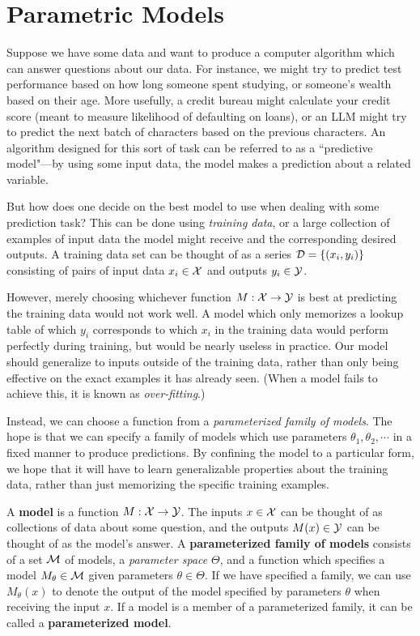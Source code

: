 \documentclass[12pt,twoside]{reedthesis}
\begin{document}
\section{Parametric Models}
Suppose we have some data and want to produce a computer algorithm which can answer questions about our data. For instance, we might try to predict test performance based on how long someone spent studying, or someone's wealth based on their age. More usefully, a credit bureau might calculate your credit score (meant to measure likelihood of defaulting on loans), or an LLM might try to predict the next batch of characters based on the previous characters. An algorithm designed for this sort of task can be referred to as a ``predictive model"—by using some input data, the model makes a prediction about a related variable.

But how does one decide on the best model to use when dealing with some prediction task? This can be done using \textit{training data}, or a large collection of examples of input data the model might receive and the corresponding desired outputs. A training data set can be thought of as a series $\mathcal{D} = \left\{ (x_i, y_i) \right\}$ consisting of pairs of input data $x_i \in \mathcal{X}$ and outputs $y_i \in \mathcal{Y}$.

However, merely choosing whichever function $M: \mathcal{X} \to \mathcal{Y}$ is best at predicting the training data would not work well. A model which only memorizes a lookup table of which $y_i$ corresponds to which $x_i$ in the training data would perform perfectly during training, but would be nearly useless in practice. Our model should generalize to inputs outside of the training data, rather than only being effective on the exact examples it has already seen. (When a model fails to achieve this, it is known as \textit{over-fitting}.)

Instead, we can choose a function from a \textit{parameterized family of models}. The hope is that we can specify a family of models which use parameters $\theta_1, \theta_2, \cdots$ in a fixed manner to produce predictions. By confining the model to a particular form, we hope that it will have to learn generalizable properties about the training data, rather than just memorizing the specific training examples.

\begin{definition}
A \textbf{model} is a function $M: \mathcal{X} \to \mathcal{Y}$. The inputs $x \in \mathcal{X}$ can be thought of as collections of data about some question, and the outputs $M(x) \in \mathcal{Y}$ can be thought of as the model's answer. A \textbf{parameterized family of models} consists of a set $\mathcal{M}$ of models, a \textit{parameter space} $\Theta$, and a function which specifies a model $M_\theta \in \mathcal{M}$ given parameters $\theta \in \Theta$. If we have specified a family, we can use $M_\theta(x)$ to denote the output of the model specified by parameters $\theta$ when receiving the input $x$. If a model is a member of a parameterized family, it can be called a \textbf{parameterized model}.\cite{taboga21}
\end{definition} 
\end{document}
